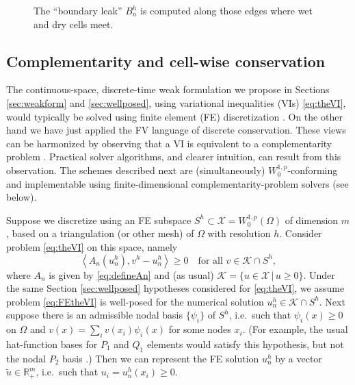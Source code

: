 \documentclass[final,onefignum]{siamart190516}
\newcommand{\ip}[2]{\ensuremath{\left<#1,#2\right>}}
\newcommand\RR{\mathbb{R}}
\begin{document}
\begin{figure}[ht]
\begin{center}

\end{center}
\caption{The ``boundary leak'' $B_n^h$ is computed along those edges where wet and dry cells meet.}
\label{fig:fvmesh-leak}
\end{figure}

\subsection{Complementarity and cell-wise conservation}  \label{subsec:ncp}  The continuous-space, discrete-time weak formulation we propose in Sections \ref{sec:weakform} and \ref{sec:wellposed}, using variational inequalities (VIs) \eqref{eq:theVI}, would typically be solved using finite element (FE) discretization \cite[for example]{CalvoDuranyVazquez2000,JouvetBueler2012,
JouvetBuelerGraeserKornhuber2013}.  On the other hand we have just applied the FV language of discrete conservation.  These views can be harmonized by observing that a VI is equivalent to a complementarity problem \cite{FacchineiPang2003,KinderlehrerStampacchia1980}.  Practical solver algorithms, and clearer intuition, can result from this observation.  The schemes described next are (simultaneously) $W_0^{1,p}$-conforming and implementable using finite-dimensional complementarity-problem solvers (see below).

Suppose we discretize using an FE subspace $S^h \subset \mathcal{X} = W_0^{1,p}(\Omega)$ of dimension $m$, based on a triangulation (or other mesh) of $\Omega$ with resolution $h$.  Consider problem \eqref{eq:theVI} on this space, namely
\begin{equation}
\ip{A_n(u_n^h)}{v^h-u_n^h} \ge 0 \quad \text{for all } v \in \mathcal{K} \cap S^h,   \label{eq:FEtheVI}
\end{equation}
where $A_n$ is given by \eqref{eq:defineAn} and (as usual) $\mathcal{K} = \{u\in \mathcal{X}\,\big|\,u\ge 0\}$.  Under the same Section \ref{sec:wellposed} hypotheses considered for \eqref{eq:theVI}, we assume problem \eqref{eq:FEtheVI} is well-posed for the numerical solution $u_n^h \in \mathcal{K} \cap S^h$.  Next suppose there is an admissible nodal basis $\{\psi_i\}$ of $S^h$, i.e.~such that $\psi_i(x)\ge 0$ on $\Omega$ and $v(x) = \sum_i v(x_i) \psi_i(x)$ for some nodes $x_i$.  (For example, the usual hat-function bases for $P_1$ and $Q_1$ elements would satisfy this hypothesis, but not the nodal $P_2$ basis \cite{Elmanetal2014}.)  Then we can represent the FE solution $u_n^h$ by a vector $\tilde u \in \RR_+^m$, i.e.~such that $u_i = u_n^h(x_i) \ge 0$.
\end{document}
